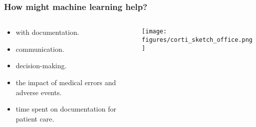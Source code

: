 \begin{frame}
    \frametitle{How might machine learning help?}
    \begin{columns}
        \begin{column}{0.35\textwidth}
            \begin{itemize}
                \item <1->  with documentation.
                \item <1->  communication.
                \item <1->  decision-making.
                \vspace{1em}
                \item <2->  the impact of medical errors and adverse events.
                \item <2->  time spent on documentation for patient care.
            \end{itemize}
        \end{column}
        \begin{column}{0.65\textwidth}
            \centering
            \texttt{[image: figures/corti\_sketch\_office.png]}
        \end{column}
    \end{columns}

\end{frame}




